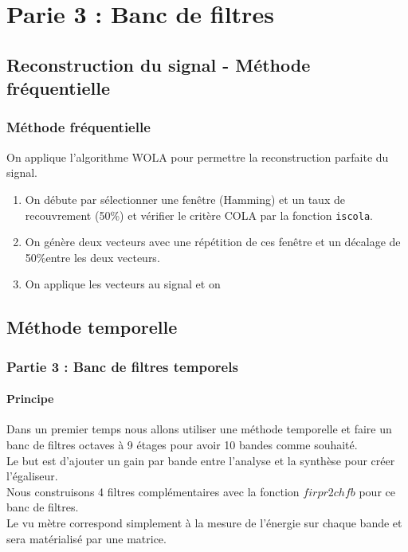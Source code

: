 \documentclass[
10pt,
aspectratio=169,
]{beamer}
\begin{document}

\section{Parie 3 : Banc de filtres}
\subsection{Reconstruction du signal - Méthode fréquentielle}
\begin{frame}
\frametitle{Méthode fréquentielle}
On applique l'algorithme WOLA pour permettre la reconstruction parfaite du signal. 
\begin{enumerate}
\item On débute par sélectionner une fenêtre (Hamming) et un taux de recouvrement (50\%) et vérifier le critère COLA par la fonction \texttt{iscola}.
\item On génère deux vecteurs avec une répétition de ces fenêtre et un décalage de 50\%entre les deux vecteurs.
\item On applique les vecteurs au signal et on 
\end{enumerate}
\end{frame}

\subsection{Méthode temporelle}

\begin{frame}
\frametitle{Partie 3 : Banc de filtres temporels} 
\framesubtitle{Principe}
Dans un premier temps nous allons utiliser une méthode temporelle et faire un banc de filtres octaves à 9 étages pour avoir 10 bandes comme souhaité. \\
Le but est d'ajouter un gain par bande entre l'analyse et la synthèse pour créer l'égaliseur. \\
Nous construisons 4 filtres complémentaires avec la fonction $firpr2chfb$ pour ce banc de filtres. \\ 
Le vu mètre correspond simplement à la mesure de l'énergie sur chaque bande et sera matérialisé par une matrice.
\end{frame}
\end{document}
